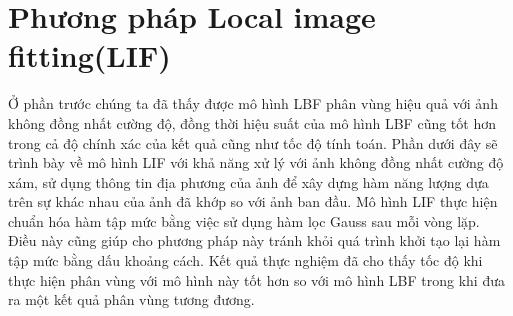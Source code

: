 \documentclass[14pt,oneside,a4paper]{extreport}
\begin{document}
\section{Phương pháp Local image fitting(LIF)}
Ở phần trước chúng ta đã thấy được mô hình LBF phân vùng hiệu quả với ảnh không đồng nhất cường độ, đồng thời hiệu suất của mô hình LBF cũng tốt hơn trong cả độ chính xác của kết quả cũng như tốc độ tính toán. Phần dưới đây sẽ trình bày về mô hình LIF với khả năng xử lý với ảnh không đồng nhất cường độ xám, sử dụng thông tin địa phương của ảnh để xây dựng hàm năng lượng dựa trên sự khác nhau của ảnh đã khớp so với ảnh ban đầu. Mô hình LIF thực hiện chuẩn hóa hàm tập mức bằng việc sử dụng hàm lọc Gauss sau mỗi vòng lặp. Điều này cũng giúp cho phương pháp này tránh khỏi quá trình khởi tạo lại hàm tập mức bằng dấu khoảng cách. Kết quả thực nghiệm đã cho thấy tốc độ khi thực hiện phân vùng với mô hình này tốt hơn so với mô hình LBF trong khi đưa ra một kết quả phân vùng tương đương.
\end{document}
